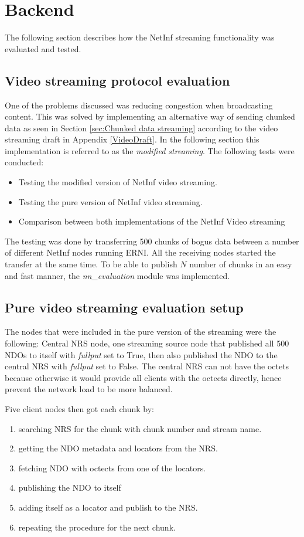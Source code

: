 \section{Backend}

The following section describes how the NetInf streaming functionality was evaluated and tested. 

\subsection{Video streaming protocol evaluation}
One of the problems discussed was reducing congestion when broadcasting content. 
This was solved by implementing an alternative way of sending chunked data as seen in 
Section \ref{sec:Chunked data streaming} according to the video streaming draft in 
Appendix \ref{VideoDraft}. In the following section this implementation is referred to
as the \textit{modified streaming}. 
The following tests were conducted:

\begin{itemize}
\item Testing the modified version of NetInf video streaming. 
\item Testing the pure version of NetInf video streaming.
\item Comparison between both implementations of the NetInf Video streaming
\end{itemize}

The testing was done by transferring 500 chunks of bogus data between a number of different NetInf nodes running ERNI. 
All the receiving nodes started the transfer at the same time.
To be able to publish $N$ number of chunks in an easy and fast manner, the \textit{nn\_evaluation} module was implemented.

\subsection{Pure video streaming evaluation setup}
The nodes that were included in the pure version of the streaming were the following:
Central NRS node, one streaming source node that published all 500 NDOs to itself with 
\textit{fullput} set to True, then also published the NDO to the central NRS with 
\textit{fullput} set to False. The central NRS can not have the octets 
because otherwise it would provide all clients with the octects directly, 
hence prevent the network load to be more balanced.

Five client nodes then got each chunk by:
\begin{enumerate}
\item searching NRS for the chunk with chunk number and stream name.
\item getting the NDO metadata and locators from the NRS.
\item fetching NDO with octects from one of the locators.
\item publishing the NDO to itself 
\item adding itself as a locator and publish to the NRS.
\item repeating the procedure for the next chunk.
\end{enumerate}

